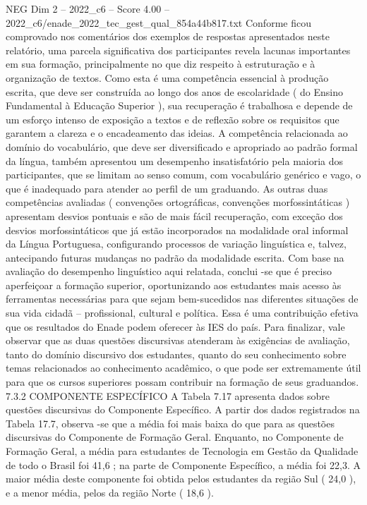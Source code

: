 \begin{textsample}{NEG Dim 2 – 2022\_c6 – Score 4.00 – 2022\_c6/enade\_2022\_tec\_gest\_qual\_854a44b817.txt}
Conforme ficou comprovado nos comentários dos exemplos de respostas apresentados neste relatório, uma parcela significativa dos participantes revela lacunas importantes em sua formação, principalmente no que diz respeito à estruturação e à organização de textos.
Como esta é uma competência essencial à produção escrita, que deve ser construída ao longo dos anos de escolaridade ( do Ensino Fundamental à Educação Superior ), sua recuperação é trabalhosa e depende de um esforço intenso de exposição a textos e de reflexão sobre os requisitos que garantem a clareza e o encadeamento das ideias.
A competência relacionada ao domínio do vocabulário, que deve ser diversificado e apropriado ao padrão formal da língua, também apresentou um desempenho insatisfatório pela maioria dos participantes, que se limitam ao senso comum, com vocabulário genérico e vago, o que é inadequado para atender ao perfil de um graduando.
As outras duas competências avaliadas ( convenções ortográficas, convenções morfossintáticas ) apresentam desvios pontuais e são de mais fácil recuperação, com exceção dos desvios morfossintáticos que já estão incorporados na modalidade oral informal da Língua Portuguesa, configurando processos de variação linguística e, talvez, antecipando futuras mudanças no padrão da modalidade escrita.
Com base na avaliação do desempenho linguístico aqui relatada, conclui -se que é preciso aperfeiçoar a formação superior, oportunizando aos estudantes mais acesso às ferramentas necessárias para que sejam bem-sucedidos nas diferentes situações de sua vida cidadã – profissional, cultural e política.
Essa é uma contribuição efetiva que os resultados do Enade podem oferecer às IES do país.
Para finalizar, vale observar que as duas questões discursivas atenderam às exigências de avaliação, tanto do domínio discursivo dos estudantes, quanto do seu conhecimento sobre temas relacionados ao conhecimento acadêmico, o que pode ser extremamente útil para que os cursos superiores possam contribuir na formação de seus graduandos. 7.3.2 COMPONENTE ESPECÍFICO A Tabela 7.17 apresenta dados sobre questões discursivas do Componente Específico.
A partir dos dados registrados na Tabela 17.7, observa -se que a média foi mais baixa do que para as questões discursivas do Componente de Formação Geral.
Enquanto, no Componente de Formação Geral, a média para estudantes de Tecnologia em Gestão da Qualidade de todo o Brasil foi 41,6 ; na parte de Componente Específico, a média foi 22,3.
A maior média deste componente foi obtida pelos estudantes da região Sul ( 24,0 ), e a menor média, pelos da região Norte ( 18,6 ).

\end{textsample}
